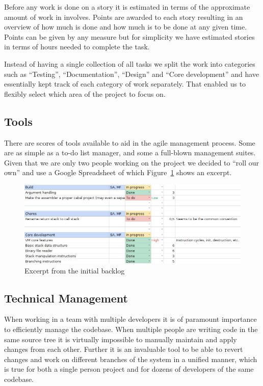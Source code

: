 Before any work is done on a story it is estimated in terms of the approximate
amount of work in involves. Points are awarded to each story resulting in an
overview of how much is done and how much is to be done at any given
time. Points can be given by any measure but for simplicity we have estimated
stories in terms of hours needed to complete the task.

Instead of having a single collection of all tasks we split the work into
categories such as ``Testing'', ``Documentation'', ``Design'' and ``Core
development'' and have essentially kept track of each category of work
separately. That enabled us to flexibly select which area of the project to
focus on.

\subsection{Tools}
\label{sec:project-mgmt:tools}

There are scores of tools available to aid in the agile management process. Some
are as simple as a to-do list manager, and some a full-blown management
suites. Given that we are only two people working on the project we decided to
``roll our own'' and use a Google Spreadsheet of which
Figure~\ref{fig:project-mgm:backlog} shows an excerpt.

\begin{figure}[h]
  \centering

  \includegraphics[width=.9\textwidth]{./images/backlog}

  \caption{Excerpt from the initial backlog}
  \label{fig:project-mgm:backlog}
\end{figure}


\subsection{Technical Management}

When working in a team with multiple developers it is of paramount importance to
efficiently manage the codebase. When multiple people are writing code in the
same source tree it is virtually impossible to manually maintain and apply
changes from each other. Further it is an invaluable tool to be able to revert
changes and work on different branches of the system in a unified manner, which
is true for both a single person project and for dozens of developers of the
same codebase.

